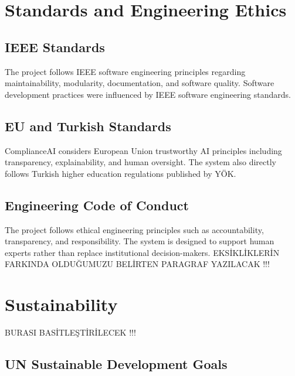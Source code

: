 \documentclass[a4paper,12pt]{article}
\begin{document}

\section{Standards and Engineering Ethics}

\subsection{IEEE Standards}

\hspace{0.5cm} The project follows IEEE software engineering principles regarding maintainability, modularity, documentation, and software quality. Software development practices were influenced by IEEE software engineering standards.

\subsection{EU and Turkish Standards}

\hspace{0.5cm} ComplianceAI considers European Union trustworthy AI principles including transparency, explainability, and human oversight. The system also directly follows Turkish higher education regulations published by YÖK.

\subsection{Engineering Code of Conduct}

\hspace{0.5cm} The project follows ethical engineering principles such as accountability, transparency, and responsibility. The system is designed to support human experts rather than replace institutional decision-makers.
EKSİKLİKLERİN FARKINDA OLDUĞUMUZU BELİRTEN PARAGRAF YAZILACAK !!!


\section{Sustainability}
BURASI BASİTLEŞTİRİLECEK !!!

\subsection{UN Sustainable Development Goals}
\end{document}
